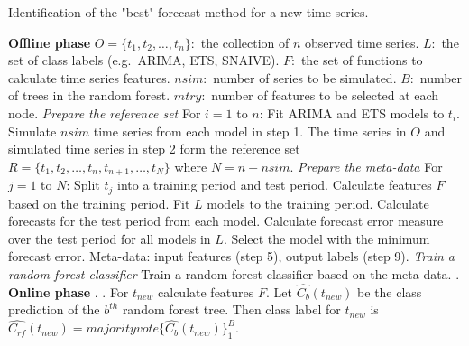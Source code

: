 \documentclass[11pt,a4paper,]{article}
\theoremstyle{definition}
\theoremstyle{definition}
\theoremstyle{definition}
\theoremstyle{remark}
\begin{document}
\begin{algorithm}[!ht]
  \caption{Identification of the "best" forecast method for a new time series.}
  \label{alg:algo-lab}
  \begin{algorithmic}[1]
    \Statex \textbf{Offline phase}
    \Statex {}
    \Statex \hspace{1cm}$O=\{t_1, t_2, \dots,t_n\}:$ the collection of $n$ observed time series.
      \Statex \hspace{1cm}$L:$ the set of class labels (e.g.\ ARIMA, ETS, SNAIVE).
         \Statex \hspace{1cm}$F:$ the set of functions to calculate time series features.
         \Statex \hspace{1cm}$nsim:$ number of series to be simulated.
         \Statex \hspace{1cm}$B:$ number of trees in the random forest.
         \Statex \hspace{1cm}$mtry:$ number of features to be selected at each node.
     \Statex {}
      \Statex \hspace{1cm} 
      \Statex
     \Statex \textit{Prepare the reference set}
    \Statex For $i=1$ to $n$:
            \State Fit ARIMA and ETS models to $t_i$.
            \State Simulate $nsim$ time series from each model in step 1.
            \State The time series in $O$ and simulated time series in step 2 form the reference set $R=\{t_1, t_2, \dots,t_n, t_{n+1},\dots,t_N\}$ where $N = n + nsim$.
    \Statex 
    \Statex \textit{Prepare the meta-data}
    \Statex For $j=1$ to $N$:
            \State Split $t_j$ into a training period and test period.
            \State Calculate features $F$ based on the training period. 
            \State Fit $L$ models to the training period.
            \State Calculate forecasts for the test period from each model.
            \State Calculate forecast error measure over the test period for all models in $L$.
            \State Select the model with the minimum forecast error.
            \State Meta-data: input features (step 5), output labels (step 9).
     \Statex
    \Statex \textit{Train a random forest classifier}
            \State Train a random forest classifier based on the meta-data.
            . 
    \Statex
     \Statex \textbf{Online phase}
    \Statex {}
    \Statex \hspace{1cm} .
     \Statex {}
      \Statex \hspace{1cm}.
  \State For $t_{new}$ calculate features $F$.
  \State Let $\hat{C_b}(t_{new})$ be the class prediction of the $b^{th}$ random forest tree. Then class label for $t_{new}$ is $\hat{C_{rf}}(t_{new})=majorityvote\{\hat{C_b}(t_{new})\}_1^B$.
   \end{algorithmic}
\end{algorithm}
\end{document}
